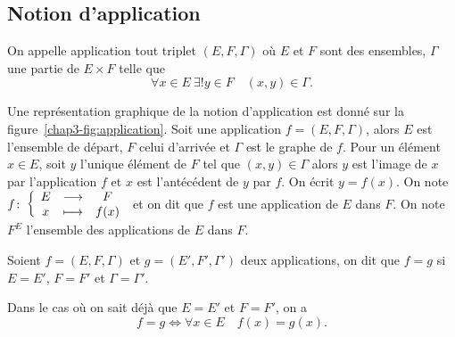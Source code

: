 \subsection{Notion d'application}
\label{chap3-subsec:notiondapplication}
\begin{defdef}
  On appelle application tout triplet \((E, F, \Gamma)\) où \(E\) et \(F\) sont des ensembles, \(\Gamma\) une partie de \(E \times F\) telle que 
  \begin{equation}
    \forall x \in E \ \exists! y \in F \quad (x,y) \in \Gamma.
  \end{equation}
\end{defdef}
Une représentation graphique de la notion d'application est donné sur la figure~\ref{chap3-fig:application}. Soit une
application \(f=(E,F,\Gamma)\), alors \(E\) est l'ensemble de départ, \(F\) celui d'arrivée et \(\Gamma\) est le graphe de \(f\).
Pour un élément \(x \in E\), soit \(y\) l'unique élément de \(F\) tel que \((x,y) \in \Gamma\) alors \(y\) est l'image de \(x\) par
l'application \(f\) et \(x\) est l'antécédent de \(y\) par \(f\). On écrit \(y=f(x)\). On note \(f\colon \left\{\begin{array}{ccc} E & \longrightarrow &F\\ x & \longmapsto & f(x) \end{array} \right.\) et on dit que \(f\) est une application de \(E\) dans \(F\). On note \(F^E\) l'ensemble des applications de \(E\) dans \(F\).
%
\begin{defdef}
  Soient \(f=(E,F,\Gamma)\) et \(g=(E',F',\Gamma')\) deux applications, on dit que \(f=g\) si \(E=E'\), \(F=F'\) et \(\Gamma=\Gamma'\).
\end{defdef}
Dans le cas où on sait déjà que \(E=E'\) et \(F=F'\), on a
\begin{equation}
  f=g \iff \forall x \in E \quad f(x)=g(x).
\end{equation}
%
